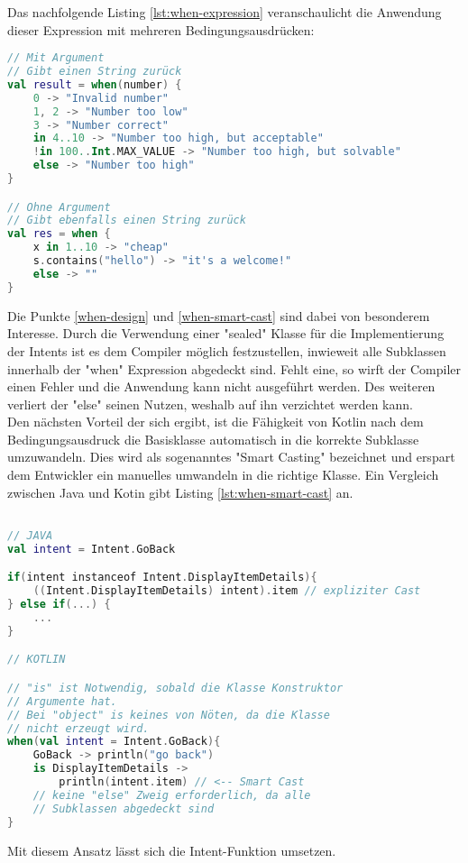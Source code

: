 Das nachfolgende Listing
\ref{lst:when-expression}
veranschaulicht die Anwendung dieser Expression mit mehreren Bedingungsausdrücken:
\begin{lstlisting}[caption={When Expression}, label={lst:when-expression}, language=Kotlin]
// Mit Argument
// Gibt einen String zurück
val result = when(number) {
	0 -> "Invalid number"
	1, 2 -> "Number too low"
	3 -> "Number correct"
	in 4..10 -> "Number too high, but acceptable"
	!in 100..Int.MAX_VALUE -> "Number too high, but solvable"
	else -> "Number too high"
}

// Ohne Argument
// Gibt ebenfalls einen String zurück
val res = when {
	x in 1..10 -> "cheap"
	s.contains("hello") -> "it's a welcome!"
	else -> ""
}
\end{lstlisting}
\bigskip
Die Punkte
\ref{when-design}
und
\ref{when-smart-cast}
sind dabei von besonderem Interesse. Durch die Verwendung einer "sealed" Klasse für die Implementierung der Intents ist es dem Compiler möglich festzustellen, inwieweit alle Subklassen innerhalb der "when" Expression abgedeckt sind. Fehlt eine, so wirft der Compiler einen Fehler und die Anwendung kann nicht ausgeführt werden. Des weiteren verliert der "else" seinen Nutzen, weshalb auf ihn verzichtet werden kann.
\\
Den nächsten Vorteil der sich ergibt, ist die Fähigkeit von Kotlin nach dem Bedingungsausdruck die Basisklasse automatisch in die korrekte Subklasse umzuwandeln. Dies wird als sogenanntes "Smart Casting" bezeichnet und erspart dem Entwickler ein manuelles umwandeln in die richtige Klasse.
Ein Vergleich zwischen Java und Kotin gibt Listing 
\ref{lst:when-smart-cast}
an.
\begin{lstlisting}[caption={"when" mit "smart cast"}, label={lst:when-smart-cast}, language=Kotlin]

// JAVA
val intent = Intent.GoBack

if(intent instanceof Intent.DisplayItemDetails){
	((Intent.DisplayItemDetails) intent).item // expliziter Cast
} else if(...) { 
	... 
}

// KOTLIN

// "is" ist Notwendig, sobald die Klasse Konstruktor 
// Argumente hat.
// Bei "object" is keines von Nöten, da die Klasse 
// nicht erzeugt wird.
when(val intent = Intent.GoBack){
	GoBack -> println("go back")
	is DisplayItemDetails -> 
		println(intent.item) // <-- Smart Cast
	// keine "else" Zweig erforderlich, da alle 
	// Subklassen abgedeckt sind
}
\end{lstlisting}
\bigskip
Mit diesem Ansatz lässt sich die Intent-Funktion umsetzen.

